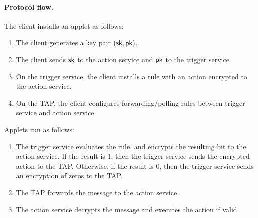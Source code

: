 \paragraph{Protocol flow.}
The client installs an applet as follows:
\begin{enumerate}[leftmargin=*]
\item The client generates a key pair $(\mathsf{sk}, \mathsf{pk})$.
\item The client sends $\mathsf{sk}$ to the action service and $\mathsf{pk}$ to the trigger
  service.
\item On the trigger service, the client installs a rule with an action
  encrypted to the action service.
\item On the TAP, the client configures forwarding/polling rules between trigger
  service and action service.
\end{enumerate}
Applets run as follows:
\begin{enumerate}[leftmargin=*]
\item The trigger service evaluates the rule, and encrypts the resulting bit to
  the action service. If the result is 1, then the trigger service sends the
  encrypted action to the TAP. Otherwise, if the result is 0, then the trigger
  service sends an encryption of zeros to the TAP.
\item The TAP forwards the message to the action service.
\item The action service decrypts the message and executes the action if valid.
\end{enumerate}
